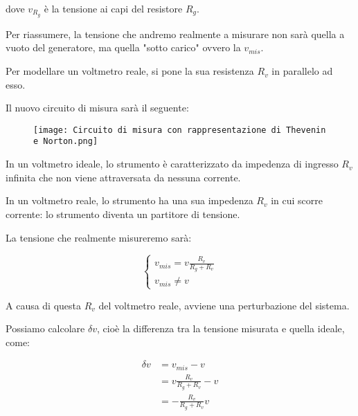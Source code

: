 dove $v_{R_{g}}$ è la tensione ai capi del resistore $R_g$. \newline 

Per riassumere, la tensione che andremo realmente a misurare non sarà quella a vuoto del generatore, 
ma quella "sotto carico" ovvero la $v_{mis}$. \newline 

Per modellare un voltmetro reale, si pone la sua resistenza $R_v$ in parallelo ad esso.\newline 

Il nuovo circuito di misura sarà il seguente: 

\begin{figure}[h]
    \centering
    \texttt{[image: Circuito di misura con rappresentazione di Thevenin e Norton.png]}
\end{figure}

In un voltmetro ideale, lo strumento è caratterizzato da impedenza di ingresso $R_v$ infinita 
che non viene attraversata da nessuna corrente. \newline 

In un voltmetro reale, lo strumento ha una sua impedenza $R_v$ in cui scorre corrente: 
lo strumento diventa un partitore di tensione. \newline 

La tensione che realmente misureremo sarà: 

{
    \Large 
    \begin{equation}
        \begin{cases}
            v_{mis}
            = 
            v \frac{R_v}{R_g + R_v} 
            \\ 
            v_{mis}
            \neq 
            v
        \end{cases}
    \end{equation}
}

A causa di questa $R_v$ del voltmetro reale, avviene una perturbazione del sistema. \newline 

Possiamo calcolare $\delta v$, cioè la differenza tra la tensione misurata e quella ideale, come: 

{
    \Large 
    \begin{equation}
        \begin{split}
            \delta v
            &= 
            v_{mis} - v 
            \\ 
            &= 
            v \frac{R_v}{R_g + R_v} - v 
            \\
            &= 
            - \frac{R_v}{R_g + R_v} v
        \end{split}
    \end{equation}
}

